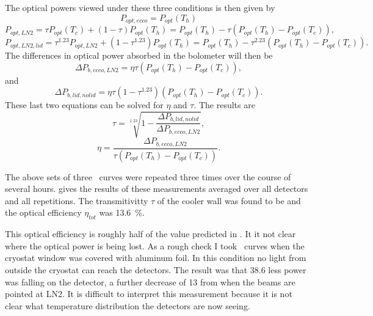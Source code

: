 The optical powers viewed under these three conditions is then given by
\begin{equation}
  P_{opt,ecco} = P_{opt}(T_h)
\end{equation}
\begin{equation}
  P_{opt,LN2} = \tau P_{opt}(T_c) + (1-\tau)P_{opt}(T_h) = P_{opt}(T_h) - \tau (P_{opt}(T_h) - P_{opt}(T_c)),
\end{equation}
\begin{equation}
  P_{opt,LN2,lid} = \tau^{1.23} P_{opt,LN2} + (1-\tau^{1.23})P_{opt}(T_h) = P_{opt}(T_h) - \tau^{2.23}(P_{opt}(T_h) - P_{opt}(T_c)) .
\end{equation}
The differences in optical power absorbed in the bolometer will then be
\begin{equation}
  \Delta P_{b,ecco,LN2} = \eta \tau (P_{opt}(T_h) - P_{opt}(T_c)),
\end{equation}
and
\begin{equation}
  \Delta P_{b,lid,no lid} = \eta \tau (1-\tau^{1.23}) (P_{opt}(T_h) - P_{opt}(T_c)).
\end{equation}
These last two equations can be solved for $\eta$ and $\tau$. The results are
\begin{equation}
   \tau = \sqrt[1.23]{1 - \frac{\Delta P_{b,lid,no lid}}{\Delta P_{b,ecco,LN2}}},
\end{equation}
\begin{equation}
   \eta = \frac{\Delta P_{b,ecco,LN2}}{ \tau ( P_{opt}(T_h) - P_{opt}(T_c) )} .
\end{equation}

The above sets of three \IV\ curves were repeated three times over the course of several hours.
 gives the results of these measurements averaged over all detectors and all repetitions.
The transmitivitty $\tau$ of the cooler wall was found to be  and the optical efficiency $\eta_{tot}$ was \SI{13.6}{\percent}. 

This optical efficiency is roughly half of the value predicted in .
It it not clear where the optical power is being lost.
As a rough check I took \IV\ curves when the cryostat window was covered with aluminum foil.
In this condition no light from outside the cryostat can reach the detectors.
The result was that \SI{38.6}{\pW} less power was falling on the detector, a further decrease of \SI{13}{\pW} from when the beams are pointed at LN2.
It is difficult to interpret this measurement because it is not clear what temperature distribution the detectors are now seeing.

